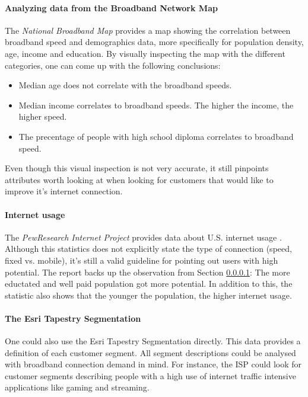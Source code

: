 \documentclass[twocolumn]{article}
\begin{document}
\paragraph{Analyzing data from the Broadband Network Map}
\label{sub:Analyzing data from the Broadband Network Map}
The \textit{National Broadband Map} provides a map showing the correlation between broadband speed and demographics data, more specifically for population density, age, income and education. By visually inspecting the map with the different categories, one can come up with the following conclusions:
\begin{itemize}
  \item Median age does not correlate with the broadband speeds. 
  \item Median income correlates to broadband speeds. The higher the income, the higher speed.
  \item The precentage of people with high school diploma correlates to broadband speed.
\end{itemize}
Even though this visual inspection is not very accurate, it still pinpoints attributes worth looking at when looking for customers that would like to improve it's internet connection.

\paragraph{Internet usage}
\label{sub:Internet usage}
The \textit{PewResearch Internet Project} provides data about U.S. internet usage \cite{noauthor_2013-ev}. Although this statistics does not explicitly state the type of connection (speed, fixed vs. mobile), it's still a valid guideline for pointing out users with high potential. The report backs up the observation from Section \ref{sub:Analyzing data from the Broadband Network Map}: The more eductated and well paid population got more potential. In addition to this, the statistic also shows that the younger the population, the higher internet usage.

\paragraph{The Esri Tapestry Segmentation}
\label{sub:The Esri Tapestry Segmentation}
One could also use the Esri Tapestry Segmentation directly. This data provides a definition of each customer segment. All segment descriptions could be analysed with broadband connection demand in mind. For instance, the ISP could look for customer segments describing people with a high use of internet traffic intensive applications like gaming and streaming.
\end{document}
